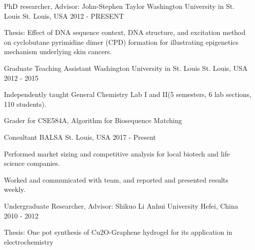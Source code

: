 

\begin{cventries}

  \cventry
    {PhD researcher, Advisor: John-Stephen Taylor} %
    {Washington University in St. Louis} %
    {St. Louis, USA} %
    {2012 - PRESENT} %
    {
    \begin{cvitems}
    \item {Thesis: Effect of DNA sequence context, DNA structure, and excitation method on cyclobutane pyrimidine dimer (CPD) formation for illustrating epigenetics mechanism underlying skin cancers.}
    \end{cvitems}
    }
  \cventry
    {Graduate Teaching Assistant} %
    {Washington University in St. Louis} %
    {St. Louis, USA} %
    {2012 - 2015} %
     {
      \begin{cvitems} %
        \item {Independently taught General Chemistry Lab I and II(5 semesters, 6 lab sections, 110 students).}
        \item {Grader for CSE584A, Algorithm for Biosequence Matching}
      \end{cvitems}
    }
  \cventry
    {Consultant} %
    {BALSA} %
    {St. Louis, USA} %
    {2017 - Present} %
    {
      \begin{cvitems} %
        \item {Performed market sizing and competitive analysis for local biotech and life science companies.}
        \item {Worked and communicated with team, and reported and presented results weekly.}
      \end{cvitems}
    }

  \cventry
    {Undergraduate Researcher, Advisor: Shikuo Li} %
    {Anhui University} %
    {Hefei, China} %
    {2010 - 2012} %
      {
    \begin{cvitems}
    \item {Thesis: One pot synthesis of Cu2O-Graphene hydrogel for its application in electrochemistry}
    \end{cvitems}
    }
 \end{cventries}